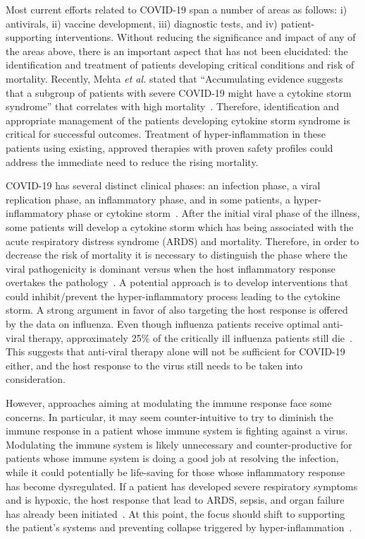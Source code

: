 Most current efforts related to COVID-19 span a number of areas as follows: i) antivirals, ii) vaccine development, iii) diagnostic tests, and iv) patient-supporting interventions. 
Without reducing the significance and impact of any of the areas above, there is an important aspect that has not been elucidated: the identification and treatment of patients developing critical conditions and risk of mortality.  Recently, Mehta \textit{et al.} stated that ``Accumulating evidence suggests that a subgroup of patients with severe COVID-19 might have a cytokine storm syndrome'' that correlates with high mortality~\cite{mehta2020covid}.
Therefore, identification and appropriate management of the patients developing cytokine storm syndrome is critical for successful outcomes. Treatment of hyper-inflammation in these patients using existing, approved therapies with proven safety profiles could address the immediate need to reduce the rising mortality. 

COVID-19 has several distinct clinical phases:  an infection phase, a viral replication phase, an inflammatory phase, and in some patients, a hyper-inflammatory phase or cytokine storm~\cite{siddiqi2020covid,Ayres2020:survivingCOVID19}. After the initial viral phase of the illness, some patients will develop a cytokine storm which has being associated with the acute respiratory distress syndrome (ARDS) and mortality.  Therefore, in order to decrease the risk of mortality it is necessary to distinguish the phase where the viral pathogenicity is dominant versus when the host inflammatory response overtakes the pathology~\cite{siddiqi2020covid,Ayres2020:survivingCOVID19}. A potential approach is to develop interventions that could inhibit/prevent the hyper-inflammatory process leading to the cytokine storm.
A strong argument in favor of also targeting the host response is offered by the data on influenza. Even though influenza patients receive optimal anti-viral therapy, approximately 25\% of the critically ill influenza patients still die~\cite{Ayres2020:survivingCOVID19,louie2012treatment}. This suggests that anti-viral therapy alone will not be sufficient for COVID-19 either, and the host response to the virus still needs to be taken into consideration.

However, approaches aiming at modulating the immune response face some concerns. In particular, it may seem counter-intuitive to try to diminish the immune response in a patient whose immune system is fighting against a virus. Modulating the immune system is likely unnecessary and counter-productive for patients whose immune system is doing a good job at resolving the infection, while it could potentially be life-saving for those whose inflammatory response has become dysregulated. If a patient has developed severe respiratory symptoms and is hypoxic, the host response that lead to ARDS, sepsis, and organ failure has already been initiated~\cite{mehta2020covid}. At this point, the focus should shift to supporting the patient's systems and preventing collapse triggered by hyper-inflammation~\cite{Ayres2020:survivingCOVID19}. 

